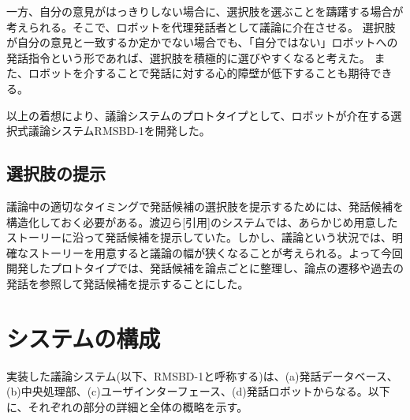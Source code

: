 \documentclass[11pt, a4paper]{jreport} %
\begin{document}
一方、自分の意見がはっきりしない場合に、選択肢を選ぶことを躊躇する場合が考えられる。そこで、ロボットを代理発話者として議論に介在させる。
選択肢が自分の意見と一致するか定かでない場合でも、「自分ではない」ロボットへの発話指令という形であれば、選択肢を積極的に選びやすくなると考えた。
また、ロボットを介することで発話に対する心的障壁が低下することも期待できる。



以上の着想により、議論システムのプロトタイプとして、ロボットが介在する選択式議論システムRMSBD-1を開発した。%


\subsection{選択肢の提示}
議論中の適切なタイミングで発話候補の選択肢を提示するためには、発話候補を構造化しておく必要がある。渡辺ら[引用]のシステムでは、あらかじめ用意したストーリーに沿って発話候補を提示していた。しかし、議論という状況では、明確なストーリーを用意すると議論の幅が狭くなることが考えられる。よって今回開発したプロトタイプでは、発話候補を論点ごとに整理し、論点の遷移や過去の発話を参照して発話候補を提示することにした。

















\section{システムの構成}
\label{sec:構成1}
実装した議論システム(以下、RMSBD-1と呼称する)は、(a)発話データベース、(b)中央処理部、(c)ユーザインターフェース、(d)発話ロボットからなる。以下に、それぞれの部分の詳細と全体の概略を示す。
\end{document}
